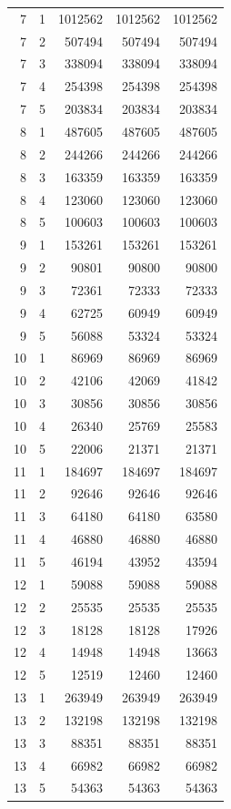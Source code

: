 \begin{longtable}{rrrrr}
7 & 1 & 1012562 & 1012562 & 1012562 \\
7 & 2 & 507494 & 507494 & 507494 \\
7 & 3 & 338094 & 338094 & 338094 \\
7 & 4 & 254398 & 254398 & 254398 \\
7 & 5 & 203834 & 203834 & 203834 \\
8 & 1 & 487605 & 487605 & 487605 \\
8 & 2 & 244266 & 244266 & 244266 \\
8 & 3 & 163359 & 163359 & 163359 \\
8 & 4 & 123060 & 123060 & 123060 \\
8 & 5 & 100603 & 100603 & 100603 \\
9 & 1 & 153261 & 153261 & 153261 \\
9 & 2 & 90801 & 90800 & 90800 \\
9 & 3 & 72361 & 72333 & 72333 \\
9 & 4 & 62725 & 60949 & 60949 \\
9 & 5 & 56088 & 53324 & 53324 \\
10 & 1 & 86969 & 86969 & 86969 \\
10 & 2 & 42106 & 42069 & 41842 \\
10 & 3 & 30856 & 30856 & 30856 \\
10 & 4 & 26340 & 25769 & 25583 \\
10 & 5 & 22006 & 21371 & 21371 \\
11 & 1 & 184697 & 184697 & 184697 \\
11 & 2 & 92646 & 92646 & 92646 \\
11 & 3 & 64180 & 64180 & 63580 \\
11 & 4 & 46880 & 46880 & 46880 \\
11 & 5 & 46194 & 43952 & 43594 \\
12 & 1 & 59088 & 59088 & 59088 \\
12 & 2 & 25535 & 25535 & 25535 \\
12 & 3 & 18128 & 18128 & 17926 \\
12 & 4 & 14948 & 14948 & 13663 \\
12 & 5 & 12519 & 12460 & 12460 \\
13 & 1 & 263949 & 263949 & 263949 \\
13 & 2 & 132198 & 132198 & 132198 \\
13 & 3 & 88351 & 88351 & 88351 \\
13 & 4 & 66982 & 66982 & 66982 \\
13 & 5 & 54363 & 54363 & 54363 \\

\end{longtable}
